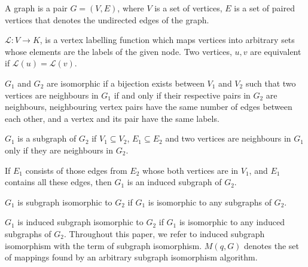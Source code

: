 \begin{definition}[Graph]
    A graph is a pair \(G = (V,E)\), where \(V\) is a set of vertices,
    \(E\) is a set of paired vertices that denotes the undirected edges 
    of the graph. 
\end{definition}

\begin{definition}[Labelling]
    \( \mathcal{L} : V \rightarrow K \), is a vertex labelling function 
    which maps vertices into arbitrary sets whose elements are the labels
    of the given node. Two vertices, \(u, v\) are equivalent if 
    \( \mathcal{L}(u) = \mathcal{L}(v) \).
\end{definition}

\begin{definition}[Isomorphism]
    \(G_1\) and \(G_2\) are isomorphic if a bijection exists between \(V_1\)
    and \(V_2\) such that two vertices are neighbours in \(G_1\) if and only
    if their respective pairs in \(G_2\) are neighbours, neighbouring 
    vertex pairs have the same number of edges between each other, and a
    vertex and its pair have the same labels.
\end{definition}

\begin{definition}[Subgraph]
    \(G_1\) is a subgraph of \(G_2\) if \(V_1 \subseteq V_2 \), \(E_1 \subseteq E_2\)
    and two vertices are neighbours in \(G_1\) only if they are neighbours in \(G_2\).
\end{definition}

\begin{definition}
    If \(E_1\) consists of those edges from \(E_2\) whose both vertices are in
    \(V_1\), and \(E_1\) contains all these edges, then \(G_1\) is an induced
    subgraph of \(G_2\).
\end{definition}

\begin{definition}
    \(G_1\) is subgraph isomorphic to \(G_2\) if \(G_1\) is isomorphic to any
    subgraphs of \(G_2\).
\end{definition}

\begin{definition}
    \(G_1\) is induced subgraph isomorphic to \(G_2\) if \(G_1\) is isomorphic to any
    induced subgraphs of \(G_2\). Throughout this paper, we refer to induced subgraph
    isomorphism with the term of subgraph isomorphism. $M(q, G)$ denotes the set of 
    mappings found by an arbitrary subgraph isomorphism algorithm.
\end{definition}



